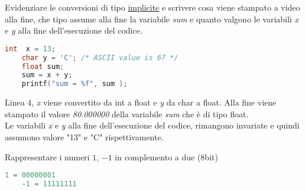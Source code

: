 \documentclass[addpoints,11pt]{exam}
\begin{document}
\boxedpoints
{}
\begin{center}
\end{center}

\vspace{5mm}

\noindent{}



\begin{questions} 

\question[1]
Evidenziare le conversioni di tipo \underline{implicite} e scrivere cosa viene stampato a video alla fine, che tipo assume alla fine la variabile \emph{sum} e quanto valgono le variabili \emph{x} e \emph{y} alla fine dell'esecuzione del codice.  


\begin{minipage}[t]{0.5\linewidth}
	\begin{lstlisting}[language=C]
	int  x = 13;
	char y = 'C'; /* ASCII value is 67 */
	float sum;
	sum = x + y;
	printf("sum = %f", sum );
	\end{lstlisting}
\end{minipage}
\begin{minipage}[t]{0.5\linewidth}
	Linea 4, \emph{x} viene convertito da int a float e \emph{y} da char a float. Alla fine viene stampato il valore \emph{80.000000} della variabile \emph{sum} che è di tipo float.
	\\
	Le variabili \emph{x} e \emph{y} alla fine dell'esecuzione del codice, rimangono invariate e quindi assumono valore "13" e "C" rispettivamente.
\end{minipage}



\question[1]
Rappresentare i numeri $1$, $-1$ in complemento a due (8bit) 

\begin{minipage}[t]{0.5\linewidth}
	
\end{minipage}
\begin{minipage}[t]{0.5\linewidth}
	\begin{lstlisting}[language=C]
	1 = 00000001
	-1 = 11111111
	\end{lstlisting}
\end{minipage}




\end{questions}
\end{document}
